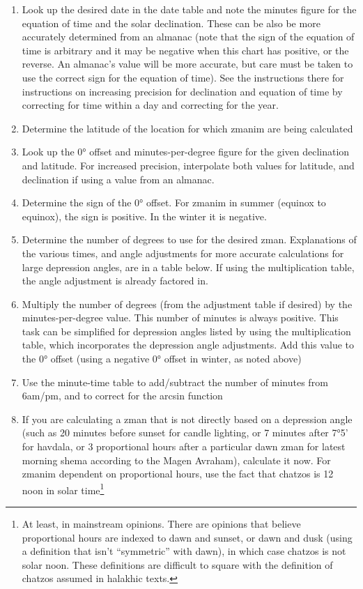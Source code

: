 \begin{enumerate}
	\item Look up the desired date in the date table and note the minutes figure for the equation of time and the solar declination. These can be also be more accurately determined from an almanac (note that the sign of the equation of time is arbitrary and it may be negative when this chart has positive, or the reverse. An almanac's value will be more accurate, but care must be taken to use the correct sign for the equation of time). See the instructions there for instructions on increasing precision for declination and equation of time by correcting for time within a day and correcting for the year.
	\item Determine the latitude of the location for which zmanim are being calculated
	\item Look up the 0° offset and minutes-per-degree figure for the given declination and latitude. For increased precision, interpolate both values for latitude, and declination if using a value from an almanac.
	\item Determine the sign of the 0° offset. For zmanim in summer (equinox to equinox), the sign is positive. In the winter it is negative.
	\item Determine the number of degrees to use for the desired zman. Explanations of the various times, and angle adjustments for more accurate calculations for large depression angles, are in a table below. If using the multiplication table, the angle adjustment is already factored in.
	\item Multiply the number of degrees (from the adjustment table if desired) by the minutes-per-degree value. This number of minutes is always positive. This task can be simplified for depression angles listed by using the multiplication table, which incorporates the depression angle adjustments. Add this value to the 0° offset (using a negative 0° offset in winter, as noted above)
	\item Use the minute-time table to add/subtract the number of minutes from 6am/pm, and to correct for the arcsin function
	\item If you are calculating a zman that is not directly based on a depression angle (such as 20 minutes before sunset for candle lighting, or 7 minutes after 7°5' for havdala, or 3 proportional hours after a particular dawn zman for latest morning shema according to the Magen Avraham), calculate it now.  For zmanim dependent on proportional hours, use the fact that chatzos is 12 noon in solar time\footnote{At least, in mainstream opinions. There are opinions that believe proportional hours are indexed to dawn and sunset, or dawn and dusk (using a definition that isn't “symmetric” with dawn), in which case chatzos is not solar noon. These definitions are difficult to square with the definition of chatzos assumed in halakhic texts.}

\end{enumerate}
